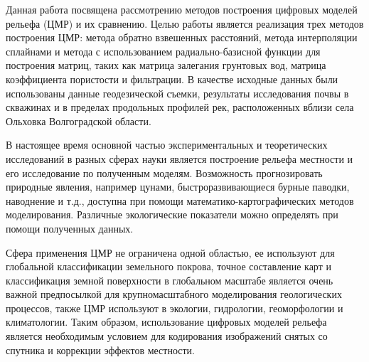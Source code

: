 \intro

Данная работа посвящена рассмотрению методов построения цифровых моделей рельефа (ЦМР) и их сравнению. Целью работы является реализация трех методов построения ЦМР: метода обратно взвешенных расстояний, метода интерполяции сплайнами и метода с использованием радиально-базисной функции для построения матриц, таких как матрица залегания грунтовых вод, матрица коэффициента пористости и фильтрации. В качестве исходные данных были использованы данные геодезической съемки, результаты исследования почвы в скважинах и в пределах продольных профилей рек, расположенных вблизи села Ольховка Волгоградской области. 

В настоящее время основной частью экспериментальных и теоретических исследований в разных сферах науки является построение рельефа местности и его исследование по полученным моделям. Возможность прогнозировать природные явления, например цунами, быстроразвивающиеся бурные паводки, наводнение и т.д., доступна при помощи математико-картографических методов моделирования. Различные экологические показатели можно определять при помощи полученных данных.

Сфера применения ЦМР не ограничена одной областью, ее используют для глобальной классификации земельного покрова, точное составление карт и классификация земной поверхности в глобальном масштабе является очень важной предпосылкой для крупномасштабного моделирования геологических процессов, также ЦМР используют в экологии, гидрологии, геоморфологии и климатологии. Таким образом, использование цифровых моделей рельефа является необходимым условием для кодирования изображений снятых со спутника и коррекции эффектов местности. 


